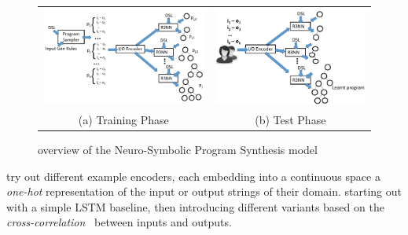 \documentclass{article}
\begin{document}
\begin{figure}[h]
    \begin{tabular}{c|c}
        \begin{minipage}{0.5\linewidth}
            \includegraphics[scale=0.3]{figures/nsps_training.pdf}
        \end{minipage}
        &
        \begin{minipage}{0.5\linewidth}
            \includegraphics[scale=0.3]{figures/nsps_test.pdf}
        \end{minipage}
        \\
        (a) Training Phase & (b) Test Phase
    \end{tabular}
    \caption{overview of the Neuro-Symbolic Program Synthesis model~\citep{nsps}}
    \label{nsps}
\end{figure}

\citet{nsps} try out different example encoders,
each embedding into a continuous space a \emph{one-hot} representation of the input or output strings of their domain.
starting out with a simple LSTM baseline,
then introducing different variants based on the \emph{cross-correlation}~\citep{bracewell1986fourier} between inputs and outputs.
\end{document}

